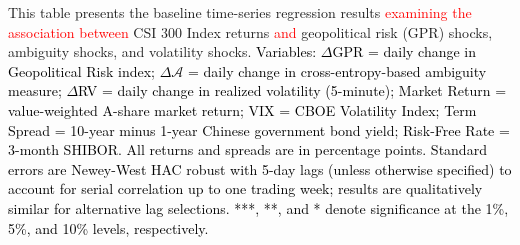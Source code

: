 \documentclass[preprint,12pt,authoryear]{elsarticle}
\begin{document}
\begin{table}[htbp]
\begin{threeparttable}
\begin{tablenotes}[flushleft]
\item[] This table presents the baseline time-series regression results \textcolor{red}{examining the association between} CSI 300 Index returns \textcolor{red}{and} geopolitical risk (GPR) shocks, ambiguity shocks, and volatility shocks. \textcolor{black}{Variables: $\Delta$GPR = daily change in Geopolitical Risk index; $\Delta \mathcal{A}$ = daily change in cross-entropy-based ambiguity measure; $\Delta$RV = daily change in realized volatility (5-minute); Market Return = value-weighted A-share market return; VIX = CBOE Volatility Index; Term Spread = 10-year minus 1-year Chinese government bond yield; Risk-Free Rate = 3-month SHIBOR. All returns and spreads are in percentage points.} \textcolor{black}{Standard errors are Newey-West HAC robust with 5-day lags (unless otherwise specified) to account for serial correlation up to one trading week; results are qualitatively similar for alternative lag selections. ***, **, and * denote significance at the 1\%, 5\%, and 10\% levels, respectively.}
\end{tablenotes}
\end{threeparttable}
\end{table}
\end{document}
